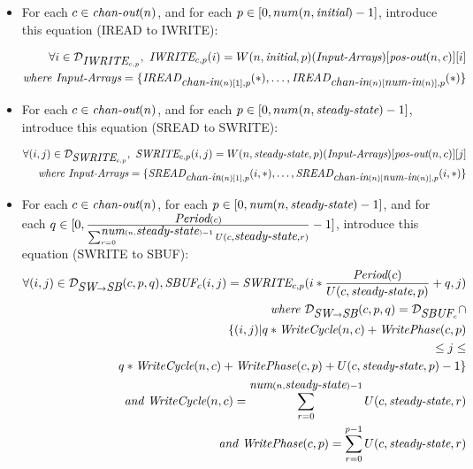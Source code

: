\begin{itemize}

\item For each $c \in \mbox{\it chan-out}(n)$, and for each $p \in [0,
num(n, \mbox{\it initial})-1]$, introduce this equation (IREAD to IWRITE):

\begin{align*}
\forall i \in {\cal D}_{\mbox{\it IWRITE}_{c, p}},~\mbox{\it IWRITE}_{c,p}(i) = W(n, \mbox{\it initial}, p)(\mbox{\it Input-Arrays})[\mbox{\it pos-out}(n, c)][i] \\
\mbox{\it where Input-Arrays} = \{\mbox{\it IREAD}_{\mbox{\it chan-in}(n)[1], p}(*), \dots, \mbox{\it IREAD}_{\mbox{\it chan-in}(n)[\mbox{\it num-in}(n)], p}(*) \}
\end{align*}

\item For each $c \in \mbox{\it chan-out}(n)$, and for each $p \in [0,
num(n, \mbox{\it steady-state})-1]$, introduce this equation (SREAD to SWRITE):

\begin{align*}
\forall (i, j) \in {\cal D}_{\mbox{\it SWRITE}_{c, p}},~\mbox{\it SWRITE}_{c,p}(i,j) = W(n, \mbox{\it steady-state}, p)(\mbox{\it Input-Arrays})[\mbox{\it pos-out}(n, c)][j] \\
\mbox{\it where Input-Arrays} = \{\mbox{\it SREAD}_{\mbox{\it chan-in}(n)[1], p}(i, *), \dots, \mbox{\it SREAD}_{\mbox{\it chan-in}(n)[\mbox{\it num-in}(n)], p}(i, *) \}
\end{align*}

\item For each $c \in \mbox{\it chan-out}(n)$, for each $p \in [0,
\mbox{\it num}(n, \mbox{\it steady-state})-1]$, and for each $q \in [0,
\frac{\mbox{\it Period}(c)}{\sum_{r=0}^{\mbox{\it num}(n, \mbox{\it steady-state})-1}
U(c, \mbox{\it steady-state}, r)}-1]$, introduce this equation (SWRITE to
SBUF):
\begin{align*}
\forall (i,j) \in {\cal D}_{\mbox{\it SW} \rightarrow \mbox{\it SB}}(c,p,q), \mbox{\it SBUF}_{c}(i,j) = \mbox{\it SWRITE}_{c, p}(i * \frac{\mbox{\it Period}(c)}{U(c, \mbox{\it steady-state},p)} + q, j) \\
\mbox{\it where } {\cal D}_{\mbox{\it SW} \rightarrow \mbox{\it SB}}(c,p,q) = {\cal D}_{\mbox{\it SBUF}_{c}} \cap \\
\{ (i,j) | q*\mbox{\it WriteCycle}(n,c) + \mbox{\it WritePhase}(c,p) \\ \le j \le \\ q*\mbox{\it WriteCycle}(n,c) + \mbox{\it WritePhase}(c,p) + U(c, \mbox{\it steady-state}, p) - 1 \} \\
\mbox{\it and } \mbox{\it WriteCycle}(n,c) = \sum_{r=0}^{\mbox{\it num}(n, \mbox{\it steady-state})-1} U(c, \mbox{\it steady-state}, r) \\
\mbox{\it and } \mbox{\it WritePhase}(c,p) = \sum_{r=0}^{p-1} U(c, \mbox{\it steady-state}, r)
\end{align*}


\end{itemize}

